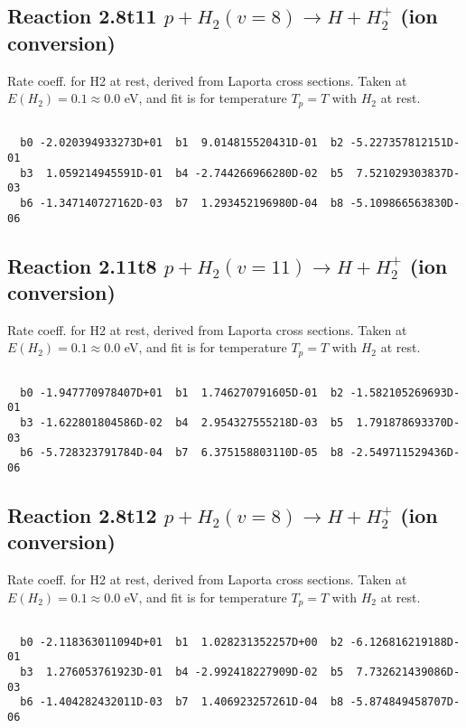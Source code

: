 \documentclass[12pt,dvipdfmx]{article}
\begin{document}
\newpage
\subsection{
Reaction 2.8t11
$ p + H_2(v=8) \rightarrow H + H_2^+$ (ion conversion)
}
Rate coeff. for H2 at rest, derived from Laporta cross sections.
Taken at $E(H_2) = 0.1 \approx 0.0$ eV,  and fit is for temperature $T_p=T$ with $H_2$ at rest.

\begin{small}\begin{verbatim}

  b0 -2.020394933273D+01  b1  9.014815520431D-01  b2 -5.227357812151D-01
  b3  1.059214945591D-01  b4 -2.744266966280D-02  b5  7.521029303837D-03
  b6 -1.347140727162D-03  b7  1.293452196980D-04  b8 -5.109866563830D-06

\end{verbatim}\end{small}

\newpage
\subsection{
Reaction 2.11t8
$ p + H_2(v=11) \rightarrow H + H_2^+$ (ion conversion)
}
Rate coeff. for H2 at rest, derived from Laporta cross sections.
Taken at $E(H_2) = 0.1 \approx 0.0$ eV,  and fit is for temperature $T_p=T$ with $H_2$ at rest.

\begin{small}\begin{verbatim}

  b0 -1.947770978407D+01  b1  1.746270791605D-01  b2 -1.582105269693D-01
  b3 -1.622801804586D-02  b4  2.954327555218D-03  b5  1.791878693370D-03
  b6 -5.728323791784D-04  b7  6.375158803110D-05  b8 -2.549711529436D-06

\end{verbatim}\end{small}

\newpage
\subsection{
Reaction 2.8t12
$ p + H_2(v=8) \rightarrow H + H_2^+$ (ion conversion)
}
Rate coeff. for H2 at rest, derived from Laporta cross sections.
Taken at $E(H_2) = 0.1 \approx 0.0$ eV,  and fit is for temperature $T_p=T$ with $H_2$ at rest.

\begin{small}\begin{verbatim}

  b0 -2.118363011094D+01  b1  1.028231352257D+00  b2 -6.126816219188D-01
  b3  1.276053761923D-01  b4 -2.992418227909D-02  b5  7.732621439086D-03
  b6 -1.404282432011D-03  b7  1.406923257261D-04  b8 -5.874849458707D-06

\end{verbatim}\end{small}
\end{document}
